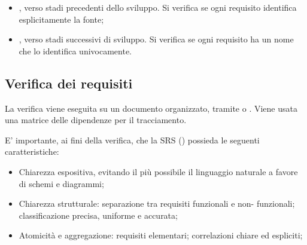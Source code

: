 \begin{itemize}
        \begin{itemize}
          \item {}, verso stadi precedenti
                dello sviluppo. Si verifica se ogni requisito identifica
                esplicitamente la fonte;
          \item {}, verso stadi successivi di
                sviluppo. Si verifica se ogni requisito ha un nome che lo
                identifica univocamente.
        \end{itemize}

\end{itemize}

\subsection{Verifica dei requisiti}

La verifica viene eseguita su un documento organizzato, tramite
 o . Viene usata una matrice
delle dipendenze per il tracciamento.

E' importante, ai fini della verifica, che la SRS () possieda le seguenti caratteristiche:

\begin{itemize}
  \item Chiarezza espositiva, evitando il più possibile il linguaggio naturale a
        favore di schemi e diagrammi;
  \item Chiarezza strutturale: separazione tra requisiti funzionali e non-
        funzionali; classificazione precisa, uniforme e accurata;
  \item Atomicità e aggregazione: requisiti elementari; correlazioni chiare ed
        espliciti;
\end{itemize}
